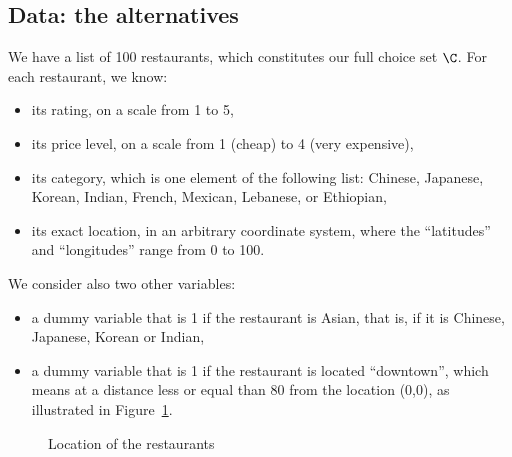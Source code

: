 \documentclass[12pt,a4paper]{article}
\begin{document}
\subsection{Data: the alternatives}
We have a list of 100 restaurants, which constitutes our full choice set $\C$.
For each restaurant, we know:
\begin{itemize}
\item its rating, on a scale from 1 to 5, 
\item its price level, on a scale from 1 (cheap) to 4 (very expensive),
\item its category, which is one element of the following list: Chinese, Japanese, Korean, Indian, French, Mexican, Lebanese, or Ethiopian,
\item its exact location, in an arbitrary coordinate system, where the ``latitudes'' and ``longitudes'' range from 0 to 100. 
\end{itemize}

We consider also two other variables: 
\begin{itemize}
\item a dummy variable that is 1 if the restaurant is Asian, that is, if it is Chinese, Japanese, Korean or Indian,
\item a dummy variable that is 1 if the restaurant is located ``downtown'', which means at a distance less or equal than 80 from the location (0,0), as illustrated in Figure~\ref{fig:restaurants}.
\end{itemize}

  
\mydata

\begin{figure}[htb]
\begin{center}
\end{center}
\caption{\label{fig:restaurants}Location of the restaurants}
\end{figure}
\end{document}
